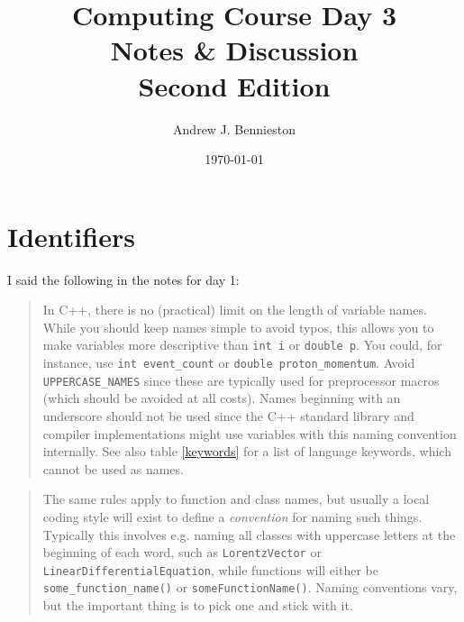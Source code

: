 \documentclass[a4paper]{scrartcl}
\title{Computing Course Day 3\\
Notes \& Discussion\\
Second Edition}
\author{Andrew J. Bennieston}
\date{\today}
\begin{document}
\maketitle

\tableofcontents

\listoftables

\pagebreak

\section{Identifiers}
I said the following in the notes for day 1:

\begin{quote}
In C++, there is no (practical) limit on the length of variable names. While you should keep names simple to avoid typos, this allows you to make variables more descriptive than \texttt{int i} or \texttt{double p}. You could, for instance, use \texttt{int event\_count} or \texttt{double proton\_momentum}. Avoid \texttt{UPPERCASE\_NAMES} since these are typically used for preprocessor macros (which should be avoided at all costs). Names beginning with an underscore should not be used since the C++ standard library and compiler implementations might use variables with this naming convention internally. See also table \ref{keywords} for a list of language keywords, which cannot be used as names.
\end{quote}

\begin{quote}
The same rules apply to function and class names, but usually a local coding style will exist to define a \emph{convention} for naming such things. Typically this involves e.g. naming all classes with uppercase letters at the beginning of each word, such as \texttt{LorentzVector} or \texttt{LinearDifferentialEquation}, while functions will either be \texttt{some\_function\_name()} or \texttt{someFunctionName()}. Naming conventions vary, but the important thing is to pick one and stick with it.
\end{quote}
\end{document}
